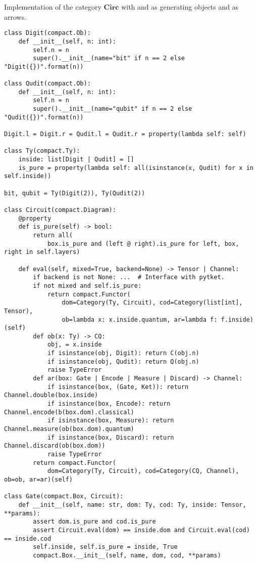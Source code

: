 \begin{python}
{\normalfont Implementation of the category $\mathbf{Circ}$ with  and  as generating objects and  as arrows.}

\begin{verbatim}
class Digit(compact.Ob):
    def __init__(self, n: int):
        self.n = n
        super().__init__(name="bit" if n == 2 else "Digit({})".format(n))

class Qudit(compact.Ob):
    def __init__(self, n: int):
        self.n = n
        super().__init__(name="qubit" if n == 2 else "Qudit({})".format(n))

Digit.l = Digit.r = Qudit.l = Qudit.r = property(lambda self: self)

class Ty(compact.Ty):
    inside: list[Digit | Qudit] = []
    is_pure = property(lambda self: all(isinstance(x, Qudit) for x in self.inside))

bit, qubit = Ty(Digit(2)), Ty(Qudit(2))

class Circuit(compact.Diagram):
    @property
    def is_pure(self) -> bool:
        return all(
            box.is_pure and (left @ right).is_pure for left, box, right in self.layers)

    def eval(self, mixed=True, backend=None) -> Tensor | Channel:
        if backend is not None: ...  # Interface with pytket.
        if not mixed and self.is_pure:
            return compact.Functor(
                dom=Category(Ty, Circuit), cod=Category(list[int], Tensor),
                ob=lambda x: x.inside.quantum, ar=lambda f: f.inside)(self)
        def ob(x: Ty) -> CQ:
            obj, = x.inside
            if isinstance(obj, Digit): return C(obj.n)
            if isinstance(obj, Qudit): return Q(obj.n)
            raise TypeError
        def ar(box: Gate | Encode | Measure | Discard) -> Channel:
            if isinstance(box, (Gate, Ket)): return Channel.double(box.inside)
            if isinstance(box, Encode): return Channel.encode(b(box.dom).classical)
            if isinstance(box, Measure): return Channel.measure(ob(box.dom).quantum)
            if isinstance(box, Discard): return Channel.discard(ob(box.dom))
            raise TypeError
        return compact.Functor(
            dom=Category(Ty, Circuit), cod=Category(CQ, Channel), ob=ob, ar=ar)(self)

class Gate(compact.Box, Circuit):
    def __init__(self, name: str, dom: Ty, cod: Ty, inside: Tensor, **params):
        assert dom.is_pure and cod.is_pure
        assert Circuit.eval(dom) == inside.dom and Circuit.eval(cod) == inside.cod
        self.inside, self.is_pure = inside, True
        compact.Box.__init__(self, name, dom, cod, **params)


\end{verbatim}
\end{python}
